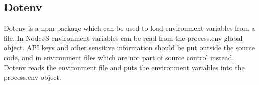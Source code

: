 \subsection{Dotenv}
Dotenv is a npm package which can be used to load environment variables from a file. In NodeJS environment variables can be read from the process.env global object. API keys and other sensitive information should be put outside the source code, and in environment files which are not part of source control instead. Dotenv reads the environment file and puts the environment variables into the process.env object.